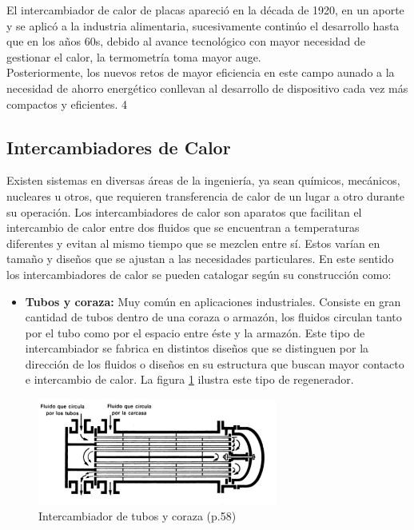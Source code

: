 \documentclass[12pt,letterpaper]{article}     %
\begin{document}
El intercambiador de calor de placas apareció en la década de 1920, en un aporte y se aplicó a la industria alimentaria, sucesivamente continúo el desarrollo hasta que en los años 60s, debido al avance tecnológico con mayor necesidad de gestionar el calor, la termometría toma mayor auge.\\
Posteriormente, los nuevos retos de mayor eficiencia en este campo  aunado a la necesidad de ahorro energético conllevan al desarrollo de dispositivo cada vez más compactos y eficientes. 
4


\subsection{Intercambiadores de Calor}

Existen sistemas en diversas áreas de la ingeniería, ya sean químicos, mecánicos, nucleares u otros, que requieren transferencia de calor de un lugar a otro durante su operación.  Los intercambiadores de calor son aparatos que facilitan el intercambio de calor entre dos fluidos que se encuentran a temperaturas diferentes y evitan al mismo tiempo que se mezclen entre sí.  \cite[p.\ 269]{Cengel}
Estos varían en tamaño y diseños que se ajustan a las necesidades particulares.
En este sentido los intercambiadores de calor se pueden catalogar según su construcción como:


\begin{itemize}
\item \textbf{Tubos y coraza:} Muy común en aplicaciones industriales. Consiste en gran cantidad de tubos dentro de una coraza o armazón, los fluidos circulan tanto por el tubo como por el espacio entre éste y la armazón. Este tipo de intercambiador se fabrica en distintos diseños que se distinguen por la dirección de los fluidos o diseños en su estructura que buscan mayor contacto e intercambio de calor. La figura \ref{fig:coraza} ilustra este tipo de regenerador.
\end{itemize}


\begin{figure}[H]
\centering
\includegraphics[width=0.7\textwidth]{coraza.jpg}
\caption{Intercambiador de tubos y coraza \cite{Lopez} (p.58)}
\label{fig:coraza}
\end{figure}
\end{document}

